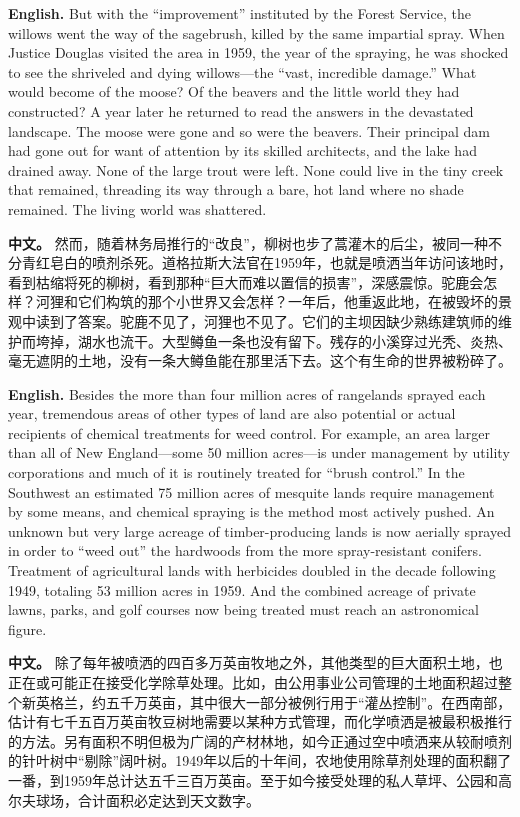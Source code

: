 \noindent\textbf{English.} But with the ``improvement'' instituted by the Forest Service, the willows went the way of the sagebrush, killed by the same impartial spray. When Justice Douglas visited the area in 1959, the year of the spraying, he was shocked to see the shriveled and dying willows---the ``vast, incredible damage.'' What would become of the moose? Of the beavers and the little world they had constructed? A year later he returned to read the answers in the devastated landscape. The moose were gone and so were the beavers. Their principal dam had gone out for want of attention by its skilled architects, and the lake had drained away. None of the large trout were left. None could live in the tiny creek that remained, threading its way through a bare, hot land where no shade remained. The living world was shattered.
\par
\noindent\textbf{中文。} 然而，随着林务局推行的“改良”，柳树也步了蒿灌木的后尘，被同一种不分青红皂白的喷剂杀死。道格拉斯大法官在1959年，也就是喷洒当年访问该地时，看到枯缩将死的柳树，看到那种“巨大而难以置信的损害”，深感震惊。驼鹿会怎样？河狸和它们构筑的那个小世界又会怎样？一年后，他重返此地，在被毁坏的景观中读到了答案。驼鹿不见了，河狸也不见了。它们的主坝因缺少熟练建筑师的维护而垮掉，湖水也流干。大型鳟鱼一条也没有留下。残存的小溪穿过光秃、炎热、毫无遮阴的土地，没有一条大鳟鱼能在那里活下去。这个有生命的世界被粉碎了。
\par\medskip

\noindent\textbf{English.} Besides the more than four million acres of rangelands sprayed each year, tremendous areas of other types of land are also potential or actual recipients of chemical treatments for weed control. For example, an area larger than all of New England---some 50 million acres---is under management by utility corporations and much of it is routinely treated for ``brush control.'' In the Southwest an estimated 75 million acres of mesquite lands require management by some means, and chemical spraying is the method most actively pushed. An unknown but very large acreage of timber-producing lands is now aerially sprayed in order to ``weed out'' the hardwoods from the more spray-resistant conifers. Treatment of agricultural lands with herbicides doubled in the decade following 1949, totaling 53 million acres in 1959. And the combined acreage of private lawns, parks, and golf courses now being treated must reach an astronomical figure.
\par
\noindent\textbf{中文。} 除了每年被喷洒的四百多万英亩牧地之外，其他类型的巨大面积土地，也正在或可能正在接受化学除草处理。比如，由公用事业公司管理的土地面积超过整个新英格兰，约五千万英亩，其中很大一部分被例行用于“灌丛控制”。在西南部，估计有七千五百万英亩牧豆树地需要以某种方式管理，而化学喷洒是被最积极推行的方法。另有面积不明但极为广阔的产材林地，如今正通过空中喷洒来从较耐喷剂的针叶树中“剔除”阔叶树。1949年以后的十年间，农地使用除草剂处理的面积翻了一番，到1959年总计达五千三百万英亩。至于如今接受处理的私人草坪、公园和高尔夫球场，合计面积必定达到天文数字。
\par\medskip

